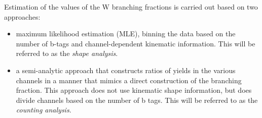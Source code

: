 Estimation of the values of the W branching fractions is carried out based on two approaches: 

\begin{itemize}
    \item maximum likelihood estimation (MLE), binning the data based on the number of b-tags and channel-dependent kinematic information. This will be referred to as the \emph{shape analysis}.
    \item a semi-analytic approach that constructs ratios of yields in the various channels in a manner that mimics a direct construction of the branching fraction.  This approach does not use kinematic shape information, but does divide channels based on the number of b tags. This will be referred to as the \emph{counting analysis}.
\end{itemize}